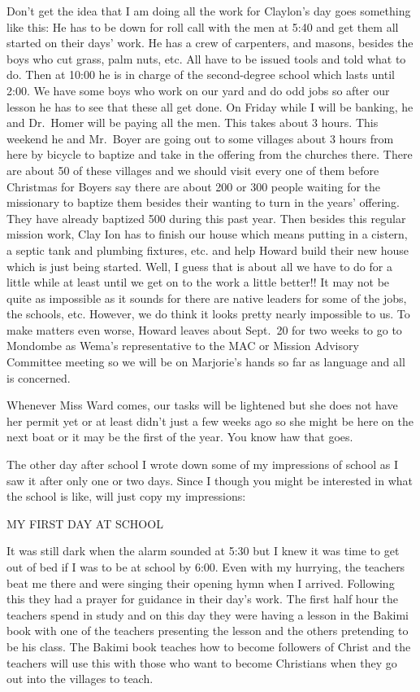 \documentclass[
]{book}
\begin{document}
Don't get the idea that I am doing all the work for Claylon's day goes something like this: He has to be down for roll call with the men at 5:40 and get them all started on their days' work. He has a crew of carpenters, and masons, besides the boys who cut grass, palm nuts, etc. All have to be issued tools and told what to do. Then at 10:00 he is in charge of the second-degree school which lasts until 2:00. We have some boys who work on our yard and do odd jobs so after our lesson he has to see that these all get done. On Friday while I will be banking, he and Dr.~Homer will be paying all the men. This takes about 3 hours. This weekend he and Mr.~Boyer are going out to some villages about 3 hours from here by bicycle to baptize and take in the offering from the churches there. There are about 50 of these villages and we should visit every one of them before Christmas for Boyers say there are about 200 or 300 people waiting for the missionary to baptize them besides their wanting to turn in the years' offering. They have already baptized 500 during this past year. Then besides this regular mission work, Clay Ion has to finish our house which means putting in a cistern, a septic tank and plumbing fixtures, etc. and help Howard build their new house which is just being started. Well, I guess that is about all we have to do for a little while at least until we get on to the work a little better!! It may not be quite as impossible as it sounds for there are native leaders for some of the jobs, the schools, etc. However, we do think it looks pretty nearly impossible to us. To make matters even worse, Howard leaves about Sept.~20 for two weeks to go to Mondombe as Wema's representative to the MAC or Mission Advisory Committee meeting so we will be on Marjorie's hands so far as language and all is concerned.

Whenever Miss Ward comes, our tasks will be lightened but she does not have her permit yet or at least didn't just a few weeks ago so she might be here on the next boat or it may be the first of the year. You know haw that goes.

The other day after school I wrote down some of my impressions of school as I saw it after only one or two days. Since I though you might be interested in what the school is like, will just copy my impressions:

MY FIRST DAY AT SCHOOL

It was still dark when the alarm sounded at 5:30 but I knew it was time to get out of bed if I was to be at school by 6:00. Even with my hurrying, the teachers beat me there and were singing their opening hymn when I arrived. Following this they had a prayer for guidance in their day's work. The first half hour the teachers spend in study and on this day they were having a lesson in the Bakimi book with one of the teachers presenting the lesson and the others pretending to be his class. The Bakimi book teaches how to become followers of Christ and the teachers will use this with those who want to become Christians when they go out into the villages to teach.
\end{document}
